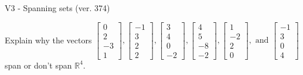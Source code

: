 \begin{exercise}
  \begin{exerciseTitle}V3 - Spanning sets (ver. 374)\end{exerciseTitle}
  \begin{exerciseStatement}
    Explain why the vectors \(\left[\begin{array}{r}
0 \\
2 \\
-3 \\
1
\end{array}\right] , \left[\begin{array}{r}
-1 \\
3 \\
2 \\
2
\end{array}\right] , \left[\begin{array}{r}
3 \\
4 \\
0 \\
-2
\end{array}\right] , \left[\begin{array}{r}
4 \\
5 \\
-8 \\
-2
\end{array}\right] , \left[\begin{array}{r}
1 \\
-2 \\
2 \\
0
\end{array}\right] , \text{ and } \left[\begin{array}{r}
-1 \\
3 \\
0 \\
4
\end{array}\right]\) span or don't span \(\mathbb{R}^4\). 
	



\end{exerciseStatement}
\end{exercise}
